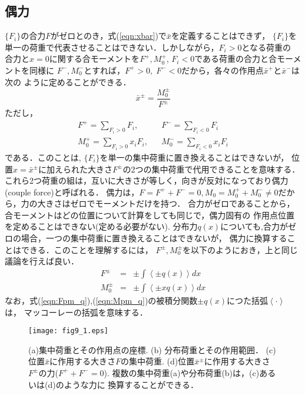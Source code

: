 \documentclass[10pt,a4j]{jbook}
\begin{document}
\subsection{偶力}
$\{F_i\}$の合力$F$がゼロとのき，式(\ref{eqn:xbar})で$\bar x$を定義することはできず，
$\{F_i\}$を単一の荷重で代表させることはできない．しかしながら，$F_i >0$となる荷重の
合力と$x=0$に関する合モーメントを$F^+, M_0^+$, $F_i<0$である荷重の合力と合モーメントを同様に
$F^-, M_0^-$とすれば，$F^+>0,\; F^-<0$だから，各々の作用点$\bar x^+$と$\bar x^-$は次の
ように定めることができる．
\begin{equation}
	\bar x ^\pm = \frac{M_0^\pm }{F ^\pm} 
	\label{eqn:xbar_pm}
\end{equation}
ただし，
\begin{eqnarray}
	F^+ = \sum _{ F_i > 0 } F_i, & & F^- = \sum _{F_i < 0 } F_i 
	\label{eqn:F_pm}
	\\
	M_0^+ = \sum _{F_i > 0 } x_i F_i, & & M_0^- = \sum _{F_i < 0 } x_iF_i 
	\label{eqn:M_pm}
\end{eqnarray}
である．このことは, $\{F_i\}$を単一の集中荷重に置き換えることはできないが，
位置$x=\bar x ^\pm$に加えられた大きさ$F^\pm$の2つの集中荷重で代用できることを意味する．
これら2つ荷重の組は，互いに大きさが等しく，向きが反対になっており偶力(couple force)と呼ばれる．
偶力は，$F=F^++F^-=0, M_0=M_0^+ + M_0^-\neq 0$だから，力の大きさはゼロでモーメントだけを持つ．
合力がゼロであることから，合モーメントはどの位置について計算をしても同じで，偶力固有の
作用点位置を定めることはできない(定める必要がない). 
分布力$q(x)$についても,合力がゼロの場合，一つの集中荷重に置き換えることはできないが，
偶力に換算することはできる．このことを理解するには，
$F^\pm, M_0^\pm$を以下のようにおき，上と同じ議論を行えば良い．
\begin{eqnarray}
	F^\pm &=& \pm \int \left< \pm q(x) \right>dx
	\label{eqn:Fpm_q} \\
	M_0^\pm &=& \pm \int \left< \pm xq(x) \right>dx
	\label{eqn:Mpm_q}
\end{eqnarray}
なお，式(\ref{eqn:Fpm_q}),(\ref{eqn:Mpm_q})の被積分関数$\pm q(x)$につた括弧$\left< \cdot \right>$は，
マッコーレーの括弧を意味する．
\begin{figure}[h]
	\begin{center}
	\texttt{[image: fig9\_1.eps]} 
	\end{center}
	\caption{
		(a)集中荷重とその作用点の座標. (b) 分布荷重とその作用範囲．
		(c)位置$\bar x$に作用する大きさ$F$の集中荷重. 
		(d)位置$\bar x^\pm$に作用する大きさ$F^\pm$の力($F^++F^-=0$). 
		複数の集中荷重(a)や分布荷重(b)は，(c)あるいは(d)のような力に
		換算することができる．
	} 
	\label{fig:fig9_1}
\end{figure}
\end{document}
